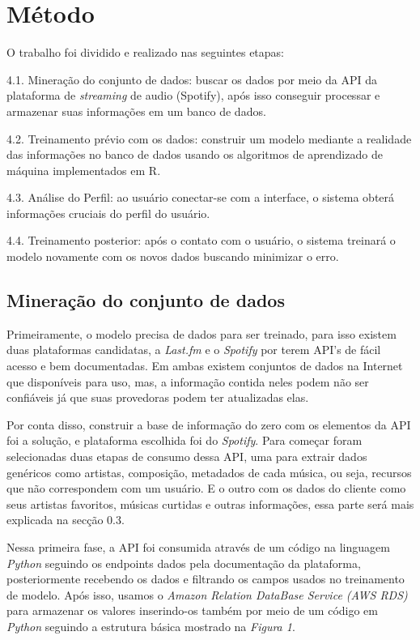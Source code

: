 \documentclass[12pt, %
openright, 
oneside, %
a4paper,    %
brazil]{facom-ufu-abntex2}
\begin{document}
\chapter{Método}

O trabalho foi dividido e realizado nas seguintes etapas:

4.1. Mineração do conjunto de dados: buscar os dados por meio da API da plataforma de \textit{streaming} de audio (Spotify), após isso conseguir processar e armazenar suas informações em um banco de dados.

4.2. Treinamento prévio com os dados: construir um modelo mediante a realidade das informações no banco de dados usando os algoritmos de aprendizado de máquina implementados em R.

4.3. Análise do Perfil: ao usuário conectar-se com a interface, o sistema obterá informações cruciais do perfil do usuário.

4.4. Treinamento posterior: após o contato com o usuário, o sistema treinará o modelo novamente com os novos dados buscando minimizar o erro.


\section{Mineração do conjunto de dados}

Primeiramente, o modelo precisa de dados para ser treinado, para isso existem duas plataformas candidatas, a \textit{Last.fm} e o \textit{Spotify} por terem API's de fácil acesso e bem documentadas. Em ambas existem conjuntos de dados na Internet que disponíveis para uso, mas, a informação contida neles podem não ser confiáveis já que suas provedoras podem ter atualizadas elas.

Por conta disso, construir a base de informação do zero com os elementos da API foi a solução, e plataforma escolhida foi do \textit{Spotify}. Para começar foram selecionadas duas etapas de consumo dessa API, uma para extrair dados genéricos como artistas, composição, metadados de cada música, ou seja, recursos que não correspondem com um usuário. E o outro com os dados do cliente como seus artistas favoritos, músicas curtidas e outras informações, essa parte será mais explicada na secção 0.3.

Nessa primeira fase, a API foi consumida através de um código na linguagem \textit{Python} seguindo os endpoints dados pela documentação da plataforma, posteriormente recebendo os dados e filtrando os campos usados no treinamento de modelo. Após isso, usamos o \textit{Amazon Relation DataBase Service (AWS RDS)} para armazenar os valores inserindo-os também por meio de um código em \textit{Python} seguindo a estrutura básica mostrado na \textit{Figura 1}.
\end{document}
